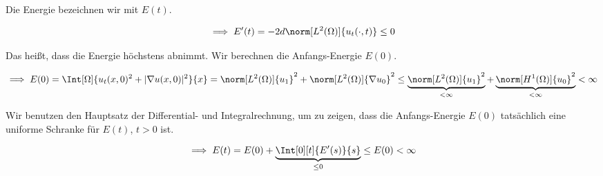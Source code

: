 \begin{solution}
\begin{enumerate}[label = (\roman*)]
    Die Energie bezeichnen wir mit $E(t)$.

    \begin{align*}
        \implies
        E^\prime(t)
        =
        -2 d \norm[L^2(\Omega)]{u_t(\cdot, t)}
        \leq
        0
    \end{align*}

    Das heißt, dass die Energie höchstens abnimmt.
    Wir berechnen die Anfangs-Energie $E(0)$.

    \begin{align*}
        \implies
        E(0)
        =
        \Int[\Omega]{u_t(x, 0)^2 + |\nabla u(x, 0)|^2}{x}
        =
        \norm[L^2(\Omega)]{u_1}^2 + \norm[L^2(\Omega)]{\nabla u_0}^2
        \leq
        \underbrace
        {
            \norm[L^2(\Omega)]{u_1}^2
        }_{
            < \infty
        }
        +
        \underbrace
        {
            \norm[H^1(\Omega)]{u_0}^2
        }_{
            < \infty
        }
        <
        \infty
    \end{align*}

    Wir benutzen den Hauptsatz der Differential- und Integralrechnung, um zu zeigen, dass die Anfangs-Energie $E(0)$ tatsächlich eine uniforme Schranke für $E(t)$, $t > 0$ ist.

    \begin{align*}
        \implies
        E(t)
        =
        E(0)
        +
        \underbrace
        {
            \Int[0][t]{E^\prime(s)}{s}
        }_{
            \leq 0
        }
        \leq
        E(0)
        <
        \infty
    \end{align*}
    

\end{enumerate}
\end{solution}
